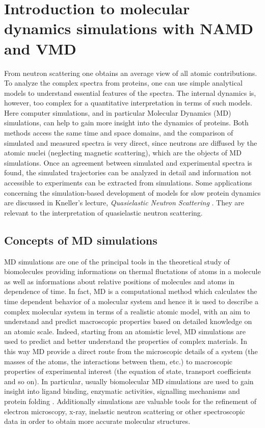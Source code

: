 \chapter{Introduction to molecular dynamics simulations with NAMD and VMD}

From neutron scattering one obtains an average view of all atomic contributions. To analyze the complex spectra from proteins, one can use simple analytical models to understand essential features of the spectra. The internal dynamics is, however, too complex for a quantitative interpretation in terms of such models. Here computer simulations, and in particular Molecular Dynamics (MD) simulations, can help to gain more insight into the dynamics of proteins. Both methods access the same time and space domains, and the comparison of simulated and measured spectra is very direct, since neutrons are diffused by the atomic nuclei (neglecting magnetic scattering), which are the objects of MD simulations. Once an agreement between simulated and experimental spectra is found, the simulated trajectories can be analyzed in detail and information not accessible to experiments can be extracted from simulations. Some applications concerning the simulation-based development of models for slow protein dynamics are discussed in Kneller's lecture, \textit{Quasielastic Neutron Scattering} \cite{ref:QNS_Keller}. They are relevant to the interpretation of quasielastic neutron scattering.

\section{Concepts of MD simulations}
MD simulations are one of the principal tools in the theoretical study of biomolecules providing informations on thermal fluctations of atoms in a molecule as well as informations about relative positions of molecules and atoms in dependence of time. In fact, MD is a computational method which calculates the time dependent behavior of a molecular system and hence it is used to describe a complex molecular system in terms of a realistic atomic model, with an aim to understand and predict macroscopic properties based on detailed knowledge on an atomic scale. Indeed, starting from an atomistic level, MD simulations are used to predict and better understand the properties of complex materials. In this way MD provide a direct route from the microscopic details of a system (the masses of the atoms, the interactions between them, etc.) to macroscopic properties of experimental interest (the equation of state, transport coefficients and so on). In particular, usually biomolecular MD simulations are used to gain insight into ligand binding, enzymatic activities, signalling mechanisms and protein folding \cite{ref:NAMD-VMD_Kukol}. Additionally simulations are valuable tools for the refinement of electron microscopy, x-ray, inelastic neutron scattering or other spectroscopic data in order to obtain more accurate molecular structures.

